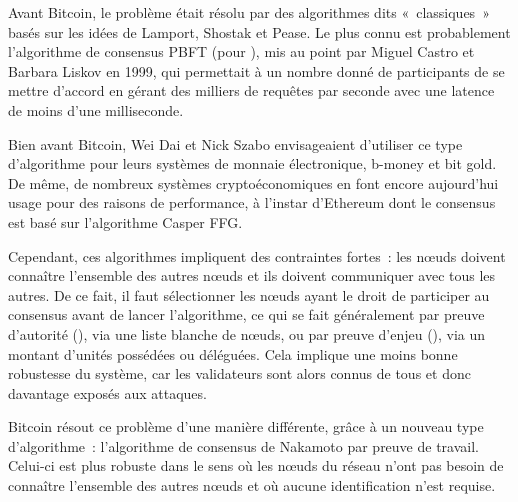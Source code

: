 

Avant Bitcoin, le problème était résolu par des algorithmes dits «~classiques~» basés sur les idées de Lamport, Shostak et Pease. Le plus connu est probablement l'algorithme de consensus PBFT (pour ), mis au point par Miguel Castro et Barbara Liskov en 1999, qui permettait à un nombre donné de participants de se mettre d'accord en gérant des milliers de requêtes par seconde avec une latence de moins d'une milliseconde.

Bien avant Bitcoin, Wei Dai et Nick Szabo envisageaient d'utiliser ce type d'algorithme pour leurs systèmes de monnaie électronique, b-money et bit gold. De même, de nombreux systèmes cryptoéconomiques en font encore aujourd'hui usage pour des raisons de performance, à l'instar d'Ethereum dont le consensus est basé sur l'algorithme Casper FFG. %

Cependant, ces algorithmes impliquent des contraintes fortes~: les nœuds doivent connaître l'ensemble des autres nœuds et ils doivent communiquer avec tous les autres. De ce fait, il faut sélectionner les nœuds ayant le droit de participer au consensus avant de lancer l'algorithme, ce qui se fait généralement par preuve d'autorité (), via une liste blanche de nœuds, ou par preuve d'enjeu (), via un montant d'unités possédées ou déléguées. Cela implique une moins bonne robustesse du système, car les validateurs sont alors connus de tous et donc davantage exposés aux attaques.



Bitcoin résout ce problème d'une manière différente, grâce à un nouveau type d'algorithme~: l'algorithme de consensus de Nakamoto par preuve de travail. Celui-ci est plus robuste dans le sens où les nœuds du réseau n'ont pas besoin de connaître l'ensemble des autres nœuds et où aucune identification n'est requise.


